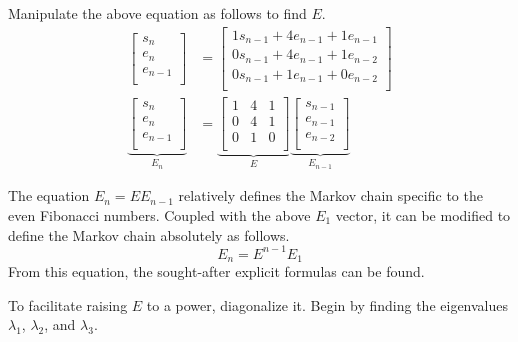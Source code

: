\documentclass[titlepage]{article}
\begin{document}
Manipulate the above equation as follows to find $E$.
\begin{align*}
    \begin{bmatrix}
        s_n\\
        e_n\\
        e_{n-1}\\
    \end{bmatrix}
    &=
    \begin{bmatrix}
        1s_{n-1}+4e_{n-1}+1e_{n-1}\\
        0s_{n-1}+4e_{n-1}+1e_{n-2}\\
        0s_{n-1}+1e_{n-1}+0e_{n-2}\\
    \end{bmatrix}\\
    \underbrace{
        \begin{bmatrix}
            s_n\\
            e_n\\
            e_{n-1}\\
        \end{bmatrix}
    }_{E_n}
    &=
    \underbrace{
        \begin{bmatrix}
            1 & 4 & 1\\
            0 & 4 & 1\\
            0 & 1 & 0\\
        \end{bmatrix}
    }_E
    \underbrace{
        \begin{bmatrix}
            s_{n-1}\\
            e_{n-1}\\
            e_{n-2}\\
        \end{bmatrix}
    }_{E_{n-1}}
\end{align*}\par
The equation $E_n=EE_{n-1}$ relatively defines the Markov chain specific to the even Fibonacci numbers. Coupled with the above $E_1$ vector, it can be modified to define the Markov chain absolutely as follows.
\begin{equation*}
    E_n = E^{n-1}E_1
\end{equation*}
From this equation, the sought-after explicit formulas can be found.\par
To facilitate raising $E$ to a power, diagonalize it. Begin by finding the eigenvalues $\lambda_1$, $\lambda_2$, and $\lambda_3$.
\end{document}
